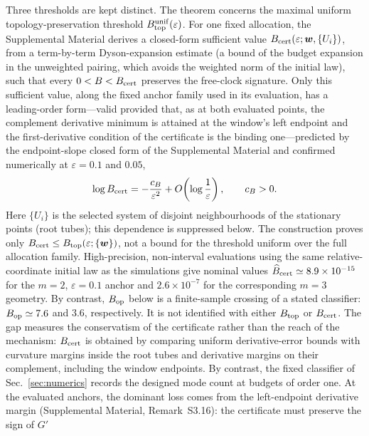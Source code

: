 \documentclass[aps,physrev,reprint,amsmath,amssymb,longbibliography,floatfix]{revtex4-2}
\begin{document}
Three thresholds are kept distinct.  The theorem concerns the maximal
uniform topology-preservation threshold
\(B_{\rm top}^{\rm unif}(\varepsilon)\).  For one fixed allocation, the
Supplemental Material \cite{supplementalMaterial} derives a closed-form
sufficient value \(B_{\rm cert}(\varepsilon;\bm w,\{U_i\})\), from a term-by-term
Dyson-expansion estimate (a bound of the budget expansion in the unweighted
pairing, which avoids the weighted norm of the initial law), such
that every \(0<B<B_{\rm cert}\) preserves the free-clock signature.  Only
this sufficient value, along the fixed anchor family used in its evaluation,
has a leading-order form---valid provided that, as at both evaluated points,
the complement derivative minimum is attained at the window's left endpoint
and the first-derivative condition of the certificate is the binding
one---predicted by the endpoint-slope closed form of the Supplemental
Material and confirmed numerically at \(\varepsilon=0.1\) and \(0.05\),
\begin{equation}
 \log B_{\rm cert}
 =-\frac{c_B}{\varepsilon^2}
  +O\!\left(\log\frac1\varepsilon\right),
 \qquad c_B>0.
\label{eq:bcert-rate}
\end{equation}
Here \(\{U_i\}\) is the selected system of disjoint neighbourhoods of the
stationary points (root tubes); this
dependence is suppressed below.  The construction proves only
\(B_{\rm cert}\le B_{\rm top}(\varepsilon;\{\bm w\})\), not a bound for
the threshold uniform over the full allocation family.
High-precision, non-interval evaluations using the same relative-coordinate
initial law as the simulations give nominal values
\(\widehat B_{\rm cert}\simeq8.9\times10^{-15}\) for the \(m=2\),
\(\varepsilon=0.1\) anchor and \(2.6\times10^{-7}\) for the corresponding
\(m=3\) geometry.  By contrast, \(B_{\rm op}\) below is a finite-sample
crossing of a stated classifier: \(B_{\rm op}\simeq7.6\) and \(3.6\),
respectively.  It is not identified with either \(B_{\rm top}\) or
\(B_{\rm cert}\).
The gap measures the conservatism of the certificate rather than the reach
of the mechanism: \(B_{\rm cert}\) is obtained by comparing uniform
derivative-error bounds with curvature margins inside the root tubes and
derivative margins on their complement, including the window endpoints.  By
contrast, the fixed classifier of Sec.~\ref{sec:numerics} records the
designed mode count at budgets of order one.  At the evaluated anchors, the
dominant loss comes from the left-endpoint derivative margin (Supplemental
Material, Remark~S3.16): the certificate must preserve the sign of \(G'\)
\end{document}
